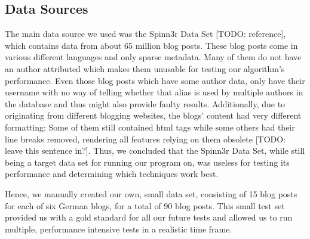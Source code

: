 
\subsection{Data Sources}
\label{sec:data_sources}

The main data source we used was the Spinn3r Data Set [TODO: reference], which contains data from about 65 million blog posts.
These blog posts come in various different languages and only sparse metadata.
Many of them do not have an author attributed which makes them unusable for testing our algorithm's performance.
Even those blog posts which have some author data, only have their username with no way of telling whether that alias is used by multiple authors in the database and thus might also provide faulty results.
Additionally, due to originating from different blogging websites, the blogs' content had very different formatting: Some of them still contained html tags while some others had their line breaks removed, rendering all features relying on them obsolete [TODO: leave this sentence in?].
Thus, we concluded that the Spinn3r Data Set, while still being a target data set for running our program on, was useless for testing its performance and determining which techniques work best.


Hence, we manually created our own, small data set, consisting of 15 blog posts for each of six German blogs, for a total of 90 blog posts.
This small test set provided us with a gold standard for all our future tests and allowed us to run multiple, performance intensive tests in a realistic time frame.